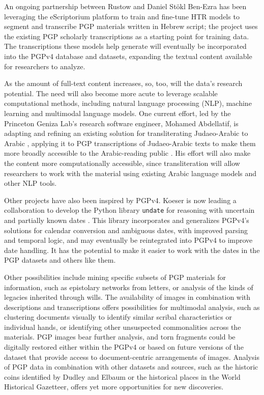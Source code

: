 \documentclass{article}
\begin{document}
An ongoing partnership between Rustow and Daniel Stökl Ben-Ezra \autocite{noauthor_handwritten_nodate} has been leveraging the eScriptorium platform to train and fine-tune HTR models to segment and transcribe PGP materials written in Hebrew script; the project uses the existing PGP scholarly transcriptions as a starting point for training data. The transcriptions these models help generate will eventually be incorporated into the PGPv4 database and datasets, expanding the textual content available for researchers to analyze.

As the amount of full-text content increases, so, too, will the data’s research potential. The need will also become more acute to leverage scalable computational methods, including natural language processing (NLP), machine learning and multimodal language models. One current effort, led by the Princeton Geniza Lab’s research software engineer, Mohamed Abdellatif, is adapting and refining an existing solution for transliterating Judaeo-Arabic to Arabic \autocite{weisberg_mitelman_code-switching_2024}, applying it to PGP transcriptions of Judaeo-Arabic texts to make them more broadly accessible to the Arabic-reading public \autocite{abdellatif_machine_2025}. His effort will also make the content more computationally accessible, since transliteration will allow researchers to work with the material using existing Arabic language models and other NLP tools.

Other projects have also been inspired by PGPv4. Koeser is now leading a collaboration to develop the Python library \texttt{undate} for reasoning with uncertain and partially known dates \autocite{koeser_undate_2024}. This library incorporates and generalizes PGPv4’s solutions for calendar conversion and ambiguous dates, with improved parsing and temporal logic, and may eventually be reintegrated into PGPv4 to improve date handling. It has the potential to make it easier to work with the dates in the PGP datasets and others like them.

Other possibilities include mining specific subsets of PGP materials for information, such as epistolary networks from letters, or analysis of the kinds of legacies inherited through wills. The availability of images in combination with descriptions and transcriptions offers possibilities for multimodal analysis, such as clustering documents visually to identify similar scribal characteristics or individual hands, or identifying other unsuspected commonalities across the materials. PGP images bear further analysis, and torn fragments could be digitally restored either within the PGPv4 or based on future versions of the dataset that provide access to document-centric arrangements of images. Analysis of PGP data in combination with other datasets and sources, such as the historic coins identified by Dudley and Elbaum or the historical places in the World Historical Gazetteer, offers yet more opportunities for new discoveries.
\end{document}
